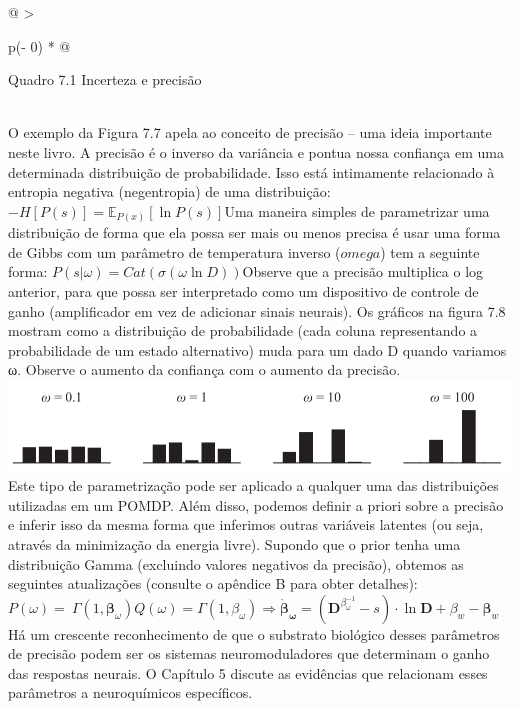 \documentclass[
  12pt,
]{book}
\begin{document}
\begin{longtable}[]{@{}
  >{\raggedright\arraybackslash}p{(\columnwidth - 0\tabcolsep) * }@{}}
\toprule
\begin{minipage}[b]{\linewidth}\raggedright
Quadro 7.1 Incerteza e precisão
\end{minipage} \\
\midrule
\endhead
O exemplo da Figura 7.7 apela ao conceito de precisão -- uma ideia importante neste livro. A precisão é o inverso da variância e pontua nossa confiança em uma determinada distribuição de probabilidade. Isso está intimamente relacionado à entropia negativa (negentropia) de uma distribuição:\( -H[P(s)]=\mathbb E_{P(x)}[\ln P(s)]\)Uma maneira simples de parametrizar uma distribuição de forma que ela possa ser mais ou menos precisa é usar uma forma de Gibbs com um parâmetro de temperatura inverso (\(omega\)) tem a seguinte forma: \( P(s |\omega )=Cat(\sigma(\omega\ln D))\)Observe que a precisão multiplica o log anterior, para que possa ser interpretado como um dispositivo de controle de ganho (amplificador em vez de adicionar sinais neurais). Os gráficos na figura 7.8 mostram como a distribuição de probabilidade (cada coluna representando a probabilidade de um estado alternativo) muda para um dado D quando variamos ω. Observe o aumento da confiança com o aumento da precisão.\includegraphics{images/Figura_7_8.png}Este tipo de parametrização pode ser aplicado a qualquer uma das distribuições utilizadas em um POMDP. Além disso, podemos definir a priori sobre a precisão e inferir isso da mesma forma que inferimos outras variáveis latentes (ou seja, através da minimização da energia livre). Supondo que o prior tenha uma distribuição Gamma (excluindo valores negativos da precisão), obtemos as seguintes atualizações (consulte o apêndice B para obter detalhes):\(P(\omega)=\ \Gamma(1,\pmb{\beta}_\omega)\)\(Q(\omega)=\Gamma(1,\beta_\omega)\)\(\Longrightarrow\pmb{\dot\beta_\omega}=(\pmb{D}^{\beta_\omega^{-1}}-s)\cdot\ln \pmb{D}+\beta_w-{\pmb{\beta}_w}\)Há um crescente reconhecimento de que o substrato biológico desses parâmetros de precisão podem ser os sistemas neuromoduladores que determinam o ganho das respostas neurais. O Capítulo 5 discute as evidências que relacionam esses parâmetros a neuroquímicos específicos. \\
\bottomrule
\end{longtable}
\end{document}
